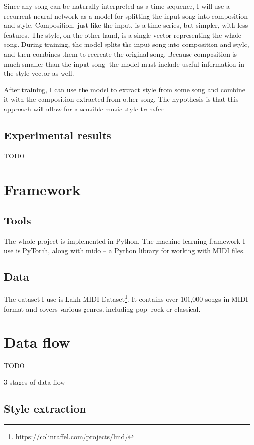 \documentclass[en]{pracamgr}
\begin{document}
Since any song can be naturally interpreted as a time sequence, I will use a recurrent neural network as a model for splitting the input song into composition and style.
Composition, just like the input, is a time series, but simpler, with less features.
The style, on the other hand, is a single vector representing the whole song.
During training, the model splits the input song into composition and style, and then combines them to recreate the original song.
Because composition is much smaller than the input song, the model must include useful information in the style vector as well.

After training, I can use the model to extract style from some song and combine it with the composition extracted from other song.
The hypothesis is that this approach will allow for a sensible music style transfer.

\section{Experimental results}

TODO

\chapter{Framework}

\section{Tools}

The whole project is implemented in Python.
The machine learning framework I use is PyTorch, along with mido -- a Python library for working with MIDI files.

\section{Data}

The dataset I use is Lakh MIDI Dataset\footnote{https://colinraffel.com/projects/lmd/}.
It contains over 100,000 songs in MIDI format and covers various genres, including pop, rock or classical.

\chapter{Data flow}

TODO

3 stages of data flow

\section{Style extraction}
\end{document}
